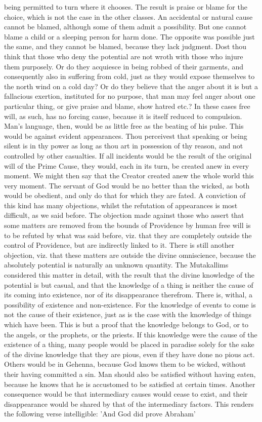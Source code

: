 \documentclass[12pt]{article}
\begin{document}
being permitted to turn where it chooses. The result is praise or blame for the choice, which is not the case in the other classes. An accidental or natural cause cannot be blamed, although some of them admit a possibility. But one cannot blame a child or a sleeping person for harm done. The opposite was possible just the same, and they cannot be blamed, because they lack judgment. Dost thou think that those who deny the potential are not wroth with those who injure them purposely. Or do they acquiesce in being robbed of their garments, and consequently also in suffering from cold, just as they would expose themselves to the north wind on a cold day? Or do they believe that the anger about it is but a fallacious exertion, instituted for no purpose, that man may feel anger about one particular thing, or give praise and blame, show hatred etc.? In these cases free will, as such, has no forcing cause, because it is itself reduced to compulsion. Man's language, then, would be as little free as the beating of his pulse. This would be against evident appearances. Thou perceivest that speaking or being silent is in thy power as long as thou art in possession of thy reason, and not controlled by other casualties. If all incidents would be the result of the original will of the Prime Cause, they would, each in its turn, be created anew in every moment. We might then say that the Creator created anew the whole world this very moment. The servant of God would be no better than the wicked, as both would be obedient, and only do that for which they are fated. A conviction of this kind has many objections, whilst the refutation of appearances is most difficult, as we said before. The objection made against those who assert that some matters are removed from the bounds of Providence by human free will is to be refuted by what was said before, viz. that they are completely outside the control of Providence, but are indirectly linked to it. There is still another objection, viz. that these matters are outside the divine omniscience, because the absolutely potential is naturally an unknown quantity. The Mutakallims considered this matter in detail, with the result that the divine knowledge of the potential is but casual, and that the knowledge of a thing is neither the cause of its coming into existence, nor of its disappearance therefrom. There is, withal, a possibility of existence and non-existence. For the knowledge of events to come is not the cause of their existence, just as is the case with the knowledge of things which have been. This is but a proof that the knowledge belongs to God, or to the angels, or the prophets, or the priests. If this knowledge were the cause of the existence of a thing, many people would be placed in paradise solely for the sake of the divine knowledge that they are pious, even if they have done no pious act. Others would be in Gehenna, because God knows them to be wicked, without their having committed a sin. Man should also be satisfied without having eaten, because he knows that he is accustomed to be satisfied at certain times. Another consequence would be that intermediary causes would cease to exist, and their disappearance would be shared by that of the intermediary factors. This renders the following verse intelligible: 'And God did prove Abraham' 
\end{document}
